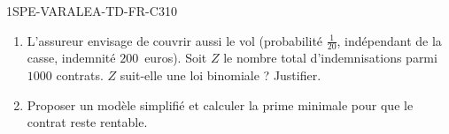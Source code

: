 \begin{exercice}{1SPE-VARALEA-TD-FR-C}{3}{10}
\begin{enumerate}
  \item L'assureur envisage de couvrir aussi le vol (probabilité $\frac{1}{20}$, indépendant de la casse, indemnité $200$~euros). Soit $Z$ le nombre total d'indemnisations parmi $1000$ contrats. $Z$ suit-elle une loi binomiale ? Justifier.
  \item Proposer un modèle simplifié et calculer la prime minimale pour que le contrat reste rentable.
\end{enumerate}
\end{exercice}
